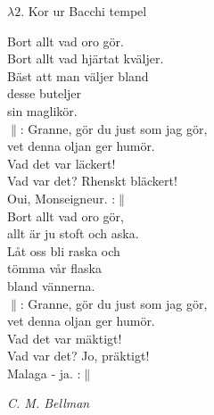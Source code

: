 \documentclass[a6paper,10pt]{article}
\newcommand{\notis}[1]{\begin{flushright}\textit{#1}\end{flushright}}
\begin{document}
\setlength{\oddsidemargin}{-0.47in}
\noindent
\begin{center}
\Large $\lambda2$. Kor ur Bacchi tempel\\
\end{center}
Bort allt vad oro gör.\\
Bort allt vad hjärtat kväljer.\\
Bäst att man väljer bland\\
desse buteljer\\
sin maglikör.
\vspace{5pt}\\
$\|$: Granne, gör du just som jag gör,\\
vet denna oljan ger humör.\\
Vad det var läckert!\\
Vad var det? Rhenskt bläckert!\\
Oui, Monseigneur. :$\|$
\vspace{5pt}\\
Bort allt vad oro gör,\\
allt är ju stoft och aska.\\
Låt oss bli raska och\\
tömma vår flaska\\
bland vännerna.
\vspace{5pt}\\
$\|$: Granne, gör du just som jag gör,\\
vet denna oljan ger humör.\\
Vad det var mäktigt!\\
Vad var det? Jo, präktigt!\\
Malaga - ja. :$\|$
\notis{C. M. Bellman}
\end{document}
